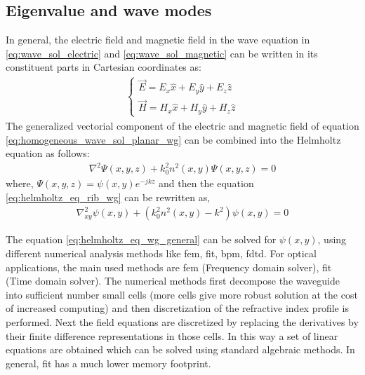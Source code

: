 \documentclass[../report.tex]{subfiles}
\begin{document}
		\subsection{Eigenvalue and wave modes}
In general, the electric field and magnetic field in the wave equation in \ref{eq:wave_sol_electric} and \ref{eq:wave_sol_magnetic} can be written in its constituent parts in Cartesian coordinates as:
\begin{equation}\label{eq:em_field_cart_cord}
\begin{aligned}
\begin{cases}
\overrightarrow{E}=E_{x}\widehat{x}+E_{y}\widehat{y}+E_{z}\widehat{z}\\
\overrightarrow{H}=H_{x}\widehat{x}+H_{y}\widehat{y}+H_{z}\widehat{z}
\end{cases}
\end{aligned}
\end{equation}
The generalized vectorial component of the electric and magnetic field of equation \ref{eq:homogeneous_wave_sol_planar_wg} can be combined into the Helmholtz equation as follows:
\begin{equation}\label{eq:helmholtz_eq_rib_wg}
	\begin{aligned}
		\nabla ^{2}\Psi \left( x,y,z\right) +k_{0}^{2}n^{2}\left(x,y\right) \Psi \left( x,y,z\right) = 0
	\end{aligned}
\end{equation}
where, $\Psi \left( x,y,z\right) = \psi \left( x,y\right)e^{-jkz} $ and then the equation \ref{eq:helmholtz_eq_rib_wg} can be rewritten as,
\begin{equation}\label{eq:helmholtz_eq_wg_general}
\begin{aligned}
\nabla_{xy} ^{2}\psi \left( x,y\right) +\left(k_{0}^{2}n^{2}\left(x,y\right) - k^2\right)\psi \left( x,y\right) = 0
\end{aligned}
\end{equation}

\noindent The equation \ref{eq:helmholtz_eq_wg_general} can be solved for $\psi \left( x,y\right)$, using different numerical analysis methods like \gls{fem}, \gls{fit}, \gls{bpm}, \gls{fdtd}. For optical applications, the main used methods are \gls{fem} (Frequency domain solver), \gls{fit} (Time domain solver). The numerical methods first decompose the waveguide into sufficient number small cells (more cells give more robust solution at the cost of increased computing) and then discretization of the refractive index profile is performed. Next the field equations are discretized by replacing the derivatives by their finite difference representations in those cells. In this way a set of linear equations are obtained which can be solved using standard algebraic methods. In general, \gls{fit} has a much lower memory footprint.\par
\end{document}
